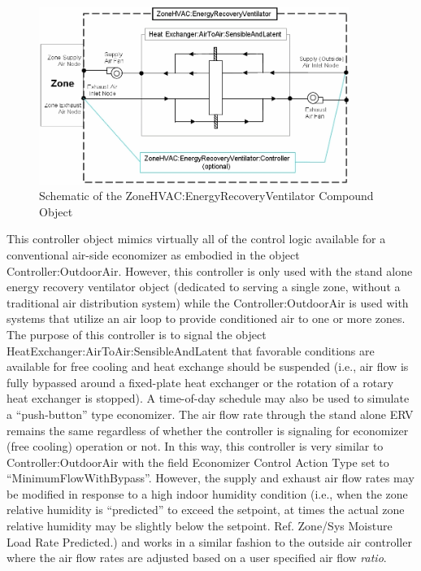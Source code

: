 \begin{figure}[hbtp] %
\centering
\includegraphics[width=0.9\textwidth, height=0.9\textheight, keepaspectratio=true]{media/image4482.png}
\caption{Schematic of the ZoneHVAC:EnergyRecoveryVentilator Compound Object \protect \label{fig:schematic-of-the-zonehvac}}
\end{figure}

This controller object mimics virtually all of the control logic available for a conventional air-side economizer as embodied in the object Controller:OutdoorAir. However, this controller is only used with the stand alone energy recovery ventilator object (dedicated to serving a single zone, without a traditional air distribution system) while the Controller:OutdoorAir is used with systems that utilize an air loop to provide conditioned air to one or more zones. The purpose of this controller is to signal the object HeatExchanger:AirToAir:SensibleAndLatent that favorable conditions are available for free cooling and heat exchange should be suspended (i.e., air flow is fully bypassed around a fixed-plate heat exchanger or the rotation of a rotary heat exchanger is stopped). A time-of-day schedule may also be used to simulate a ``push-button'' type economizer. The air flow rate through the stand alone ERV remains the same regardless of whether the controller is signaling for economizer (free cooling) operation or not. In this way, this controller is very similar to Controller:OutdoorAir with the field Economizer Control Action Type set to ``MinimumFlowWithBypass''. However, the supply and exhaust air flow rates may be modified in response to a high indoor humidity condition (i.e., when the zone relative humidity is ``predicted'' to exceed the setpoint, at times the actual zone relative humidity may be slightly below the setpoint. Ref. Zone/Sys Moisture Load Rate Predicted.) and works in a similar fashion to the outside air controller where the air flow rates are adjusted based on a user specified air flow \emph{ratio}.

